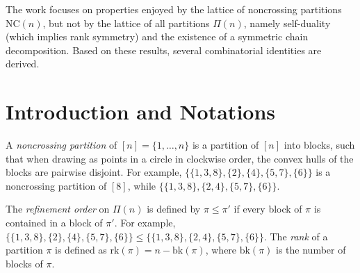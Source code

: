 The work focuses on properties enjoyed by the lattice of noncrossing partitions $\text{NC}(n)$, but not by the lattice of all partitions $\Pi(n)$, namely self-duality (which implies rank symmetry) and the existence of a symmetric chain decomposition. Based on these results, several combinatorial identities are derived.

\section{Introduction and Notations}

A \textit{noncrossing partition} of $[n]=\{1,\ldots,n\}$ is a partition of $[n]$ into blocks, such that when drawing as points in a circle in clockwise order, the convex hulls of the blocks are pairwise disjoint. For example, $\{\{1,3,8\},\{2\},\{4\}, \{5,7\},\{6\}\}$ is a noncrossing partition of $[8]$, while $\{\{1,3,8\},\{2,4\}, \{5,7\},\{6\}\}$.

\begin{figure}[h]
  \centering
  \hspace{2cm}
\end{figure}

The \textit{refinement order} on $\Pi(n)$ is defined by $\pi \leq \pi'$ if every block of $\pi$ is contained in a block of $\pi'$. For example, $\{\{1,3,8\},\{2\},\{4\}, \{5,7\},\{6\}\} \leq \{\{1,3,8\},\{2,4\}, \{5,7\},\{6\}\}$. The \textit{rank} of a partition $\pi$ is defined as $\text{rk}(\pi) = n - \text{bk}(\pi)$, where $\text{bk}(\pi)$ is the number of blocks of $\pi$.

